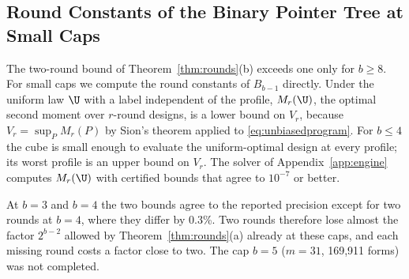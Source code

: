 \subsection{Round Constants of the Binary Pointer Tree at Small Caps}\label{app:pointerexact}
The two-round bound of Theorem~\ref{thm:rounds}(b) exceeds one only for $b\ge8$. For small caps we compute the round constants of $B_{b-1}$ directly. Under the uniform law $\U$ with a label independent of the profile, $M_r(\U)$, the optimal second moment over $r$-round designs, is a lower bound on $V_r$, because $V_r=\sup_PM_r(P)$ by Sion's theorem applied to \eqref{eq:unbiasedprogram}. For $b\le4$ the cube is small enough to evaluate the uniform-optimal design at every profile; its worst profile is an upper bound on $V_r$. The solver of Appendix~\ref{app:engine} computes $M_r(\U)$ with certified bounds that agree to $10^{-7}$ or better.

At $b=3$ and $b=4$ the two bounds agree to the reported precision except for two rounds at $b=4$, where they differ by 0.3\%. Two rounds therefore lose almost the factor $2^{b-2}$ allowed by Theorem~\ref{thm:rounds}(a) already at these caps, and each missing round costs a factor close to two. The cap $b=5$ ($m=31$, 169,911 forms) was not completed.
